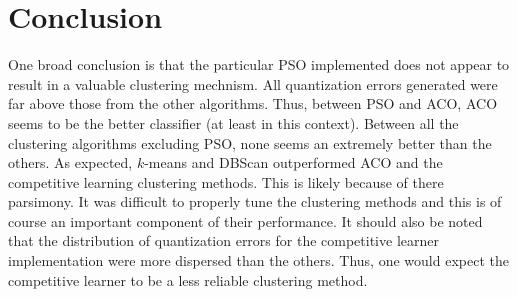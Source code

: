 \documentclass[conference]{IEEEtran}
\begin{document}
\section{Conclusion}
One broad conclusion is that the particular PSO implemented does not appear to result in a valuable clustering mechnism. All quantization errors generated were far above those from the other algorithms. Thus, between PSO and ACO, ACO seems to be the better classifier (at least in this context). Between all the clustering algorithms excluding PSO, none seems an extremely better than the others. As expected, $k$-means and DBScan outperformed ACO and the competitive learning clustering methods. This is likely because of there parsimony. It was difficult to properly tune the clustering methods and this is of course an important component of their performance. It should also be noted that the distribution of quantization errors for the competitive learner implementation were more dispersed than the others. Thus, one would expect the competitive learner to be a less reliable clustering method.
\end{document}

